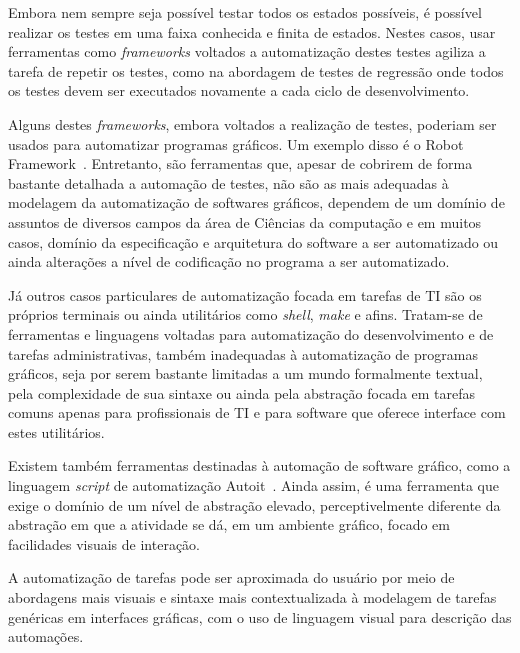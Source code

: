 \documentclass[tg]{mdtufsm}
\begin{document}
Embora nem sempre seja possível testar todos os estados possíveis, é possível realizar os testes em uma faixa
conhecida e finita de estados. Nestes casos, usar ferramentas como \emph{frameworks} voltados a automatização destes testes
agiliza a tarefa de repetir os testes, como na abordagem de testes de regressão onde todos os testes devem ser
executados novamente a cada ciclo de desenvolvimento. 


Alguns destes \emph{frameworks}, embora voltados a realização de testes, poderiam ser usados para automatizar programas gráficos. Um exemplo disso é o Robot Framework~\cite{robotFW}. Entretanto, são ferramentas que, apesar de cobrirem de forma bastante detalhada a automação de testes, não são as mais adequadas à modelagem da automatização de softwares gráficos, dependem de um domínio de assuntos de diversos campos da área de Ciências da computação e em muitos casos, domínio da especificação e arquitetura do software a ser automatizado ou ainda alterações a nível de codificação no programa a ser automatizado.

Já outros casos particulares de automatização focada em tarefas de TI são os próprios terminais ou ainda utilitários como \emph{shell},  \emph{make} e afins. Tratam-se de ferramentas e linguagens voltadas para automatização do desenvolvimento e de tarefas administrativas, também inadequadas à automatização de programas gráficos, seja por serem bastante limitadas a um mundo formalmente textual, pela complexidade de sua sintaxe ou ainda pela abstração focada em tarefas comuns apenas para profissionais de TI e para software que oferece interface com estes utilitários.

Existem também ferramentas destinadas à automação de software gráfico, como a linguagem \emph{script} de automatização Autoit~\cite{autoit}. Ainda assim, é uma ferramenta que exige o domínio de um nível de abstração elevado, perceptivelmente diferente da abstração em que a atividade se dá, em um ambiente gráfico, focado em facilidades visuais de interação.

A automatização de tarefas pode ser aproximada do usuário por meio de abordagens mais visuais e sintaxe mais contextualizada à modelagem de tarefas genéricas em interfaces gráficas, com o uso de linguagem visual para descrição das automações.
\end{document}
